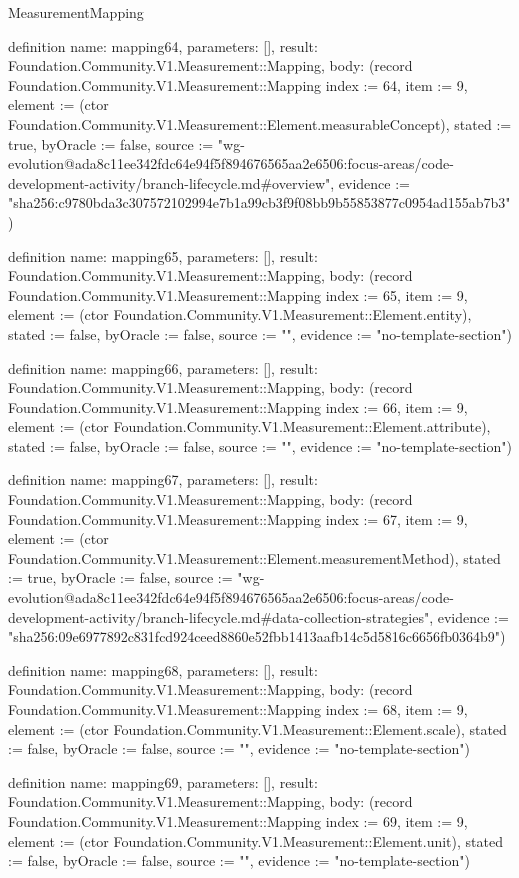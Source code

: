 \begin{lexlean}{MeasurementMapping}
\begin{semanticmodule}
definition{
  name: mapping64,
  parameters: [],
  result: Foundation.Community.V1.Measurement::Mapping,
  body: (record Foundation.Community.V1.Measurement::Mapping {index := 64, item := 9, element := (ctor Foundation.Community.V1.Measurement::Element.measurableConcept), stated := true, byOracle := false, source := "wg-evolution@ada8c11ee342fdc64e94f5f894676565aa2e6506:focus-areas/code-development-activity/branch-lifecycle.md#overview", evidence := "sha256:c9780bda3c307572102994e7b1a99cb3f9f08bb9b55853877c0954ad155ab7b3"})
}

definition{
  name: mapping65,
  parameters: [],
  result: Foundation.Community.V1.Measurement::Mapping,
  body: (record Foundation.Community.V1.Measurement::Mapping {index := 65, item := 9, element := (ctor Foundation.Community.V1.Measurement::Element.entity), stated := false, byOracle := false, source := "", evidence := "no-template-section"})
}

definition{
  name: mapping66,
  parameters: [],
  result: Foundation.Community.V1.Measurement::Mapping,
  body: (record Foundation.Community.V1.Measurement::Mapping {index := 66, item := 9, element := (ctor Foundation.Community.V1.Measurement::Element.attribute), stated := false, byOracle := false, source := "", evidence := "no-template-section"})
}

definition{
  name: mapping67,
  parameters: [],
  result: Foundation.Community.V1.Measurement::Mapping,
  body: (record Foundation.Community.V1.Measurement::Mapping {index := 67, item := 9, element := (ctor Foundation.Community.V1.Measurement::Element.measurementMethod), stated := true, byOracle := false, source := "wg-evolution@ada8c11ee342fdc64e94f5f894676565aa2e6506:focus-areas/code-development-activity/branch-lifecycle.md#data-collection-strategies", evidence := "sha256:09e6977892c831fcd924ceed8860e52fbb1413aafb14c5d5816c6656fb0364b9"})
}

definition{
  name: mapping68,
  parameters: [],
  result: Foundation.Community.V1.Measurement::Mapping,
  body: (record Foundation.Community.V1.Measurement::Mapping {index := 68, item := 9, element := (ctor Foundation.Community.V1.Measurement::Element.scale), stated := false, byOracle := false, source := "", evidence := "no-template-section"})
}

definition{
  name: mapping69,
  parameters: [],
  result: Foundation.Community.V1.Measurement::Mapping,
  body: (record Foundation.Community.V1.Measurement::Mapping {index := 69, item := 9, element := (ctor Foundation.Community.V1.Measurement::Element.unit), stated := false, byOracle := false, source := "", evidence := "no-template-section"})
}


\end{semanticmodule}
\end{lexlean}
